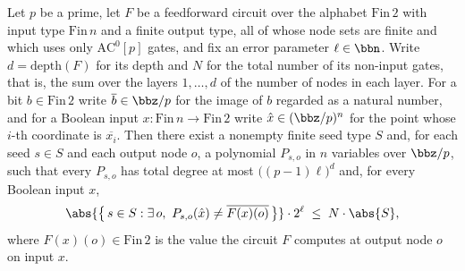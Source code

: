 \begin{theorem}
\label{RazborovSmolensky.exists_poly_distribution_for_circuit_outputs}
\leanok
{}
Let $p$ be a prime, let $F$ be a feedforward circuit over the alphabet $\mathrm{Fin}\,2$
with input type $\mathrm{Fin}\,n$ and a finite output type, all of whose node sets are
finite and which uses only $\mathrm{AC}^0[p]$ gates, and fix an error parameter $\ell
\in \bbn$. Write $d = \mathrm{depth}(F)$ for its depth and $N$ for the total number of
its non-input gates, that is, the sum over the layers $1,\dots,d$ of the number of nodes
in each layer. For a bit $b \in \mathrm{Fin}\,2$ write $\overline{b} \in \bbz/p$ for the
image of $b$ regarded as a natural number, and for a Boolean input $x : \mathrm{Fin}\,n
\to \mathrm{Fin}\,2$ write $\hat{x} \in (\bbz/p)^n$ for the point whose $i$-th
coordinate is $\overline{x_i}$. Then there exist a nonempty finite seed type $S$ and,
for each seed $s \in S$ and each output node $o$, a polynomial $P_{s,o}$ in $n$
variables over $\bbz/p$, such that every $P_{s,o}$ has total degree at most
$\bigl((p-1)\ell\bigr)^{d}$ and, for every Boolean input $x$,
\[
\abs{\bigl\{\, s \in S : \exists\, o,\ P_{s,o}(\hat{x}) \ne \overline{F(x)(o)}
\,\bigr\}} \cdot 2^{\ell} \;\le\; N \cdot \abs{S},
\]
where $F(x)(o) \in \mathrm{Fin}\,2$ is the value the circuit $F$ computes at output node
$o$ on input $x$.
\end{theorem}

